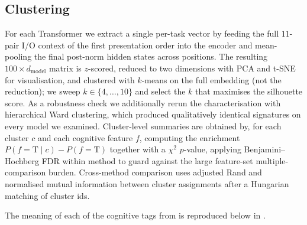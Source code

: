 \documentclass[12pt]{article}
\begin{document}
\subsection{Clustering}

For each Transformer we extract a single per-task vector by feeding the full $11$-pair I/O context of the first presentation order into the encoder and mean-pooling the final post-norm hidden states across positions. The resulting $100\times d_{\mathrm{model}}$ matrix is $z$-scored, reduced to two dimensions with PCA and t-SNE for visualisation, and clustered with $k$-means on the full embedding (not the reduction); we sweep $k \in \{4, \ldots, 10\}$ and select the $k$ that maximises the silhouette score. As a robustness check we additionally rerun the characterisation with hierarchical Ward clustering, which produced qualitatively identical signatures on every model we examined. Cluster-level summaries are obtained by, for each cluster $c$ and each cognitive feature $f$, computing the enrichment $P(f{=}\mathrm{T} \mid c) - P(f{=}\mathrm{T})$ together with a $\chi^2$ $p$-value, applying Benjamini--Hochberg FDR within method to guard against the large feature-set multiple-comparison burden. Cross-method comparison uses adjusted Rand and normalised mutual information between cluster assignments after a Hungarian matching of cluster ids.

The meaning of each of the cognitive tags from \citet{rule2024symbolic} is reproduced below in .
\end{document}
